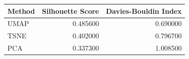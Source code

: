 \begin{tabular}{lrr}
\toprule
Method & Silhouette Score & Davies-Bouldin Index \\
\midrule
UMAP & 0.485600 & 0.690000 \\
TSNE & 0.402000 & 0.796700 \\
PCA & 0.337300 & 1.008500 \\
\bottomrule
\end{tabular}
